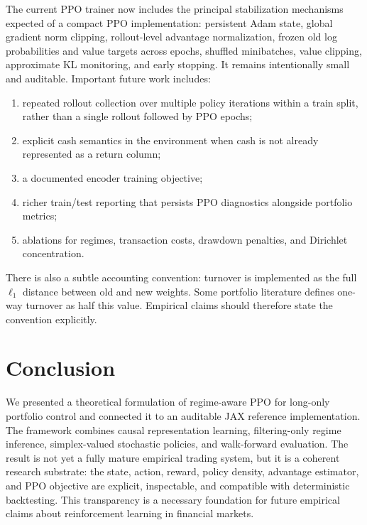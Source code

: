 \documentclass[11pt]{article}
\newcommand{\1}{\mathbf{1}}
\begin{document}
The current PPO trainer now includes the principal stabilization mechanisms
expected of a compact PPO implementation: persistent Adam state, global gradient
norm clipping, rollout-level advantage normalization, frozen old log
probabilities and value targets across epochs, shuffled minibatches, value
clipping, approximate KL monitoring, and early stopping. It remains intentionally
small and auditable. Important future work includes:
\begin{enumerate}[leftmargin=*]
  \item repeated rollout collection over multiple policy iterations within a
  train split, rather than a single rollout followed by PPO epochs;
  \item explicit cash semantics in the environment when cash is not already
  represented as a return column;
  \item a documented encoder training objective;
  \item richer train/test reporting that persists PPO diagnostics alongside
  portfolio metrics;
  \item ablations for regimes, transaction costs, drawdown penalties, and
  Dirichlet concentration.
\end{enumerate}

There is also a subtle accounting convention: turnover is implemented as the
full $\ell_1$ distance between old and new weights. Some portfolio literature
defines one-way turnover as half this value. Empirical claims should therefore
state the convention explicitly.

\section{Conclusion}

We presented a theoretical formulation of regime-aware PPO for long-only
portfolio control and connected it to an auditable JAX reference implementation.
The framework combines causal representation learning, filtering-only regime
inference, simplex-valued stochastic policies, and walk-forward evaluation. The
result is not yet a fully mature empirical trading system, but it is a coherent
research substrate: the state, action, reward, policy density, advantage
estimator, and PPO objective are explicit, inspectable, and compatible with
deterministic backtesting. This transparency is a necessary foundation for
future empirical claims about reinforcement learning in financial markets.
\end{document}

